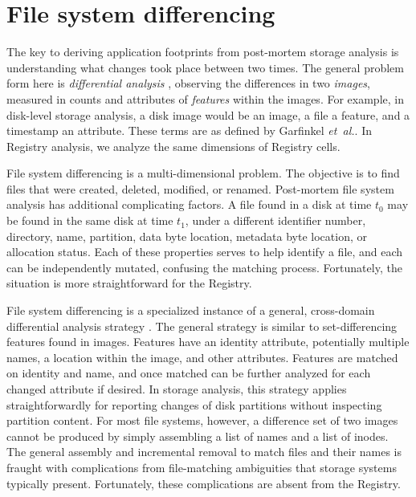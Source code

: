 \documentclass[11pt]{ucthesis}
\theoremstyle{plain}
\theoremstyle{definition}
\newcommand{\etal}{\emph{et~al.}\xspace}
\begin{document}
\section{File system differencing}

The key to deriving application footprints from post-mortem storage analysis is understanding what changes took place between two times.  The general problem form here is \emph{differential analysis} \cite{garfinkel:di12}, observing the differences in two \emph{images}, measured in counts and attributes of \emph{features} within the images.  For example, in disk-level storage analysis, a disk image would be an image, a file a feature, and a timestamp an attribute.  These terms are as defined by Garfinkel \etal \cite{garfinkel:dfrws12a}.  In Registry analysis, we analyze the same dimensions of Registry cells.

File system differencing is a multi-dimensional problem.  The objective is to find files that were created, deleted, modified, or renamed.  Post-mortem file system analysis has additional complicating factors.  A file found in a disk at time $t_0$ may be found in the same disk at time $t_1$, under a different identifier number, directory, name, partition, data byte location, metadata byte location, or allocation status.  Each of these properties serves to help identify a file, and each can be independently mutated, confusing the matching process.  Fortunately, the situation is more straightforward for the Registry.

File system differencing is a specialized instance of a general, cross-domain differential analysis strategy \cite{garfinkel:dfrws12a}.  The general strategy is similar to set-differencing features found in images.  Features have an identity attribute, potentially multiple names, a location within the image, and other attributes.  Features are matched on identity and name, and once matched can be further analyzed for each changed attribute if desired.  In storage analysis, this strategy applies straightforwardly for reporting changes of disk partitions without inspecting partition content.  For most file systems, however, a difference set of two images cannot be produced by simply assembling a list of names and a list of inodes.  The general assembly and incremental removal to match files and their names is fraught with complications from file-matching ambiguities that storage systems typically present.  Fortunately, these complications are absent from the Registry.
\end{document}
